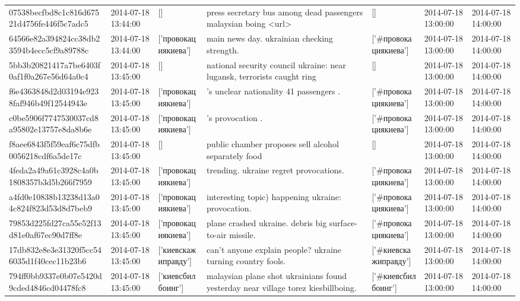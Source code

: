 \begin{tabular}{lllllll}
07538becfbd8c1c816d67521d4756fe446f5c7adc5 & 2014-07-18 13:44:00 & [] & press secretary bus among dead passengers malaysian boing <url> & [] & 2014-07-18 13:00:00 & 2014-07-18 14:00:00 \\
64566e82a394824cc38db23594b4ecc5cf9a89788c & 2014-07-18 13:44:00 & ['провокациякиева'] & main news day. ukrainian checking strength. & ['#провокациякиева'] & 2014-07-18 13:00:00 & 2014-07-18 14:00:00 \\
5bb3b20821417a7be6403f0af1f0a267e56d64a0c4 & 2014-07-18 13:45:00 & [] & national security council ukraine: near lugansk, terrorists caught ring & [] & 2014-07-18 13:00:00 & 2014-07-18 14:00:00 \\
f6e4363848d2d03194e9238faf946b49f12544943e & 2014-07-18 13:45:00 & ['провокациякиева'] & 's unclear nationality 41 passengers . & ['#провокациякиева'] & 2014-07-18 13:00:00 & 2014-07-18 14:00:00 \\
c0be5906f7747530037cd8a95802e13757e8da8b6e & 2014-07-18 13:45:00 & ['провокациякиева'] & 's provocation . & ['#провокациякиева'] & 2014-07-18 13:00:00 & 2014-07-18 14:00:00 \\
f8aee6843f5f59eaf6c75dfb0056218cdf6a5de17c & 2014-07-18 13:45:00 & [] & public chamber proposes sell alcohol separately food & [] & 2014-07-18 13:00:00 & 2014-07-18 14:00:00 \\
4feda2a49a61c3928c4a0b1808357b3d5b266f7959 & 2014-07-18 13:45:00 & ['провокациякиева'] & trending. ukraine regret provocations. & ['#провокациякиева'] & 2014-07-18 13:00:00 & 2014-07-18 14:00:00 \\
a4fd0e10838b13238d13a04c824f823d53d8d7beb9 & 2014-07-18 13:45:00 & ['провокациякиева'] & interesting topic) happening ukraine: provocation. & ['#провокациякиева'] & 2014-07-18 13:00:00 & 2014-07-18 14:00:00 \\
79853d225fd27ca55e52f13d81e0af67ec90d7ff8e & 2014-07-18 13:45:00 & ['провокациякиева'] & plane crashed ukraine. debris big surface-to-air missile. & ['#провокациякиева'] & 2014-07-18 13:00:00 & 2014-07-18 14:00:00 \\
17db832e8e3e31320f5cc546035d1f40cec11b23b6 & 2014-07-18 13:45:00 & ['киевскажиправду'] & can't anyone explain people? ukraine turning country fools. & ['#киевскажиправду'] & 2014-07-18 13:00:00 & 2014-07-18 14:00:00 \\
794ff0bb9337e0b07e5420d9cded4846cd04478fc8 & 2014-07-18 13:45:00 & ['киевсбилбоинг'] & malaysian plane shot ukrainians found yesterday near village torez kiesbillboing. & ['#киевсбилбоинг'] & 2014-07-18 13:00:00 & 2014-07-18 14:00:00 \\

\end{tabular}
